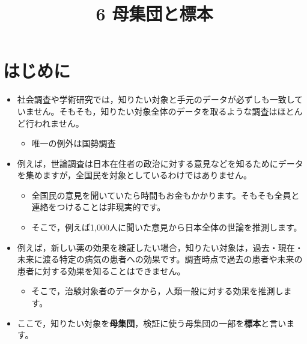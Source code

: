 \documentclass[
  letterpaper,
  DIV=11,
  numbers=noendperiod]{scrreprt}
\title{6 母集団と標本}
\author{}
\date{}
\providecommand{\tightlist}{%
  \setlength{\itemsep}{0pt}\setlength{\parskip}{0pt}}\usepackage{longtable,booktabs,array}
\begin{document}
\maketitle
\ifdefined\Shaded\renewenvironment{Shaded}{\begin{tcolorbox}[sharp corners, interior hidden, borderline west={3pt}{0pt}{shadecolor}, breakable, enhanced, frame hidden, boxrule=0pt]}{\end{tcolorbox}}\fi

\hypertarget{ux306fux3058ux3081ux306b}{%
\chapter{はじめに}\label{ux306fux3058ux3081ux306b}}

\begin{itemize}
\item
  社会調査や学術研究では，知りたい対象と手元のデータが必ずしも一致していません。そもそも，知りたい対象全体のデータを取るような調査はほとんど行われません。

  \begin{itemize}
  \tightlist
  \item
    唯一の例外は国勢調査
  \end{itemize}
\item
  例えば，世論調査は日本在住者の政治に対する意見などを知るためにデータを集めますが，全国民を対象としているわけではありません。

  \begin{itemize}
  \item
    全国民の意見を聞いていたら時間もお金もかかります。そもそも全員と連絡をつけることは非現実的です。
  \item
    そこで，例えば1,000人に聞いた意見から日本全体の世論を推測します。
  \end{itemize}
\item
  例えば，新しい薬の効果を検証したい場合，知りたい対象は，過去・現在・未来に渡る特定の病気の患者への効果です。調査時点で過去の患者や未来の患者に対する効果を知ることはできません。

  \begin{itemize}
  \tightlist
  \item
    そこで，治験対象者のデータから，人類一般に対する効果を推測します。
  \end{itemize}
\item
  ここで，知りたい対象を\textbf{母集団}，検証に使う母集団の一部を\textbf{標本}と言います。
\end{itemize}
\end{document}
